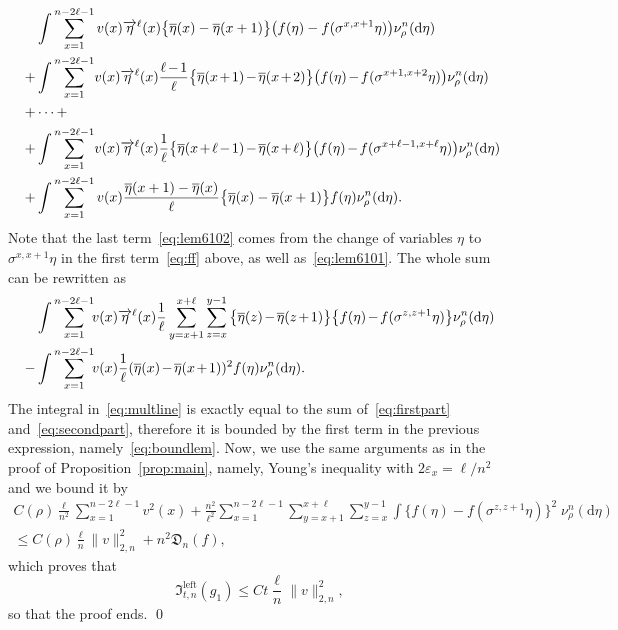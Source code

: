 \documentclass[AHL,Unicode,longabstracts]{cedram}
\newcommand*{\rmleft}{\mathrm{left}}
\newcommand{\mf}[1]{{\mathfrak #1}}
\renewcommand\vec[1]{\overrightarrow{#1}}
\renewcommand{\bar}{\overline}
\renewcommand{\leq}{\leqslant}
\newcommand*{\dd}{\mathrm{d}}
\newcommand*{\Mk}{\mkern -2mu}
\begin{document}
\begin{align}
&\int \sum_{x=1}^{n-2\ell-1}v(x)\vec{\eta}^\ell(x)\big\{\bar{\eta}(x)-\bar{\eta}(x+1)\big\}\big(f(\eta)-f(\sigma^{x,x+1}\eta)\big)\nu^n_\rho(\dd\eta) \label{eq:lem6101}
\\
+&\int \sum_{x=1}^{n-2\ell-1}\!v(x)\vec{\eta}^\ell(x)\frac{\ell\Mk-\Mk 1}{\ell}\big\{\bar{\eta}(x\Mk+\Mk 1)\Mk-\Mk\bar{\eta}(x\Mk+\Mk 2)\big\}\big(f(\eta)\Mk-\Mk f(\sigma^{x+1,x+2}\eta)\big)\nu^n_\rho(\dd\eta) \notag\\
+&\cdots+ \notag \\
+& \int \sum_{x=1}^{n-2\ell-1}\! v(x)\vec{\eta}^\ell(x)\frac{1}{\ell}\big\{\bar{\eta}(x\Mk+\Mk\ell\Mk-\Mk 1)\Mk-\Mk\bar{\eta}(x\Mk+\Mk\ell)\big\}\big(f(\eta)\Mk-\Mk f(\sigma^{x+\ell-1,x+\ell}\eta)\big)\nu^n_\rho(\dd\eta)\notag\!\!\\
\!\!+&\int\sum_{x=1}^{n-2\ell-1}v(x)\frac{\bar{\eta}(x+1)-\bar{\eta}(x)}{\ell}\big\{\bar{\eta}(x)-\bar{\eta}(x+1)\big\}f(\eta)\nu^n_\rho(\dd\eta). \label{eq:lem6102}
\end{align}
Note that the last term~\eqref{eq:lem6102} comes from the change of variables $\eta$ to $\sigma^{x,x+1}\eta$ in the first term~\eqref{eq:ff} above, as well as~\eqref{eq:lem6101}. The whole sum can be rewritten as
\begin{align}
&\int \sum_{x=1}^{n-2\ell-1}\!\!v(x)\vec{\eta}^\ell(x)\frac{1}{\ell}\sum_{y=x+1}^{x+\ell}\sum_{z=x}^{y-1}\big\{\bar{\eta}(z)\Mk-\Mk\bar{\eta}(z\Mk+\Mk 1)\big\}\big\{f(\eta)\Mk-\Mk f(\sigma^{z,z+1}\eta)\big\}\nu^n_\rho(\dd\eta)\label{eq:boundlem}
\\
-&\int\sum_{x=1}^{n-2\ell-1}\!\!v(x)\frac{1}{\ell}(\bar{\eta}(x)\Mk-\Mk\bar{\eta}(x\Mk+\Mk 1))^2f(\eta)\nu^n_\rho(\dd\eta).\label{eq:secondpart}
\end{align}
The integral in~\eqref{eq:multline} is exactly equal to the sum of~\eqref{eq:firstpart} and~\eqref{eq:secondpart}, therefore it is bounded by the first term in the previous expression, namely~\eqref{eq:boundlem}. Now, we use the same arguments as in the proof of Proposition~\ref{prop:main}, namely, Young's inequality with $2\varepsilon_x=\ell/n^2 $ and we bound it by
\begin{multline*}
C(\rho)\frac{\ell}{ n^2} \sum_{x=1}^{n-2\ell-1}v^2(x)+\frac{n^2}{{\ell^2}} \sum_{x=1}^{n-2\ell-1}\sum_{y=x+1}^{x+\ell}\sum_{z=x}^{y-1}\int \big\{f(\eta)-f(\sigma^{z,z+1}\eta)\big\}^2\; \nu^n_\rho(\dd\eta)\\
\leq C(\rho) \frac{\ell}{n} \|v\|_{2,n}^2 + n^2 \mathfrak D_n(f),
\end{multline*}
which proves that
\[
\mf I_{t,n}^{\rmleft}(g_1) \leq Ct\frac{\ell}{n} \|v\|_{2,n}^2,
\]
so that the proof ends. \qed
\end{document}
